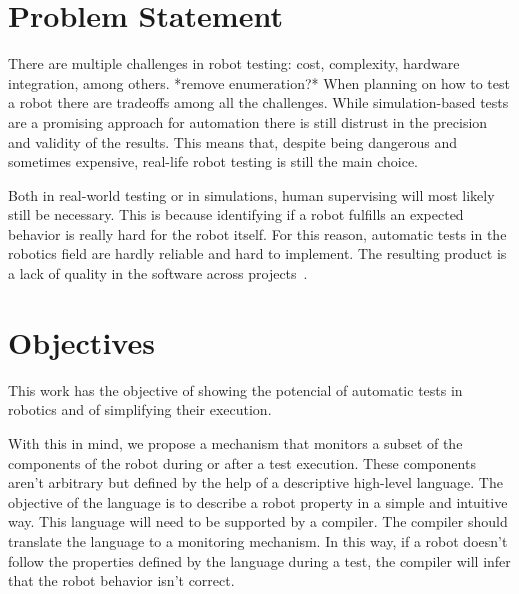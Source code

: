 \section{Problem Statement}
\label{sec:problem}

There are multiple challenges in robot testing: cost, 
complexity, hardware integration, among others. *remove enumeration?*
When planning on how to test a robot there are tradeoffs among all the challenges.
While simulation-based tests are a promising approach for automation 
there is still distrust in the precision and validity of the results.
This means that, despite being dangerous and sometimes expensive, real-life 
robot testing is still the main choice.

Both in real-world testing or in simulations, 
human supervising will most likely still be necessary.
This is because identifying if a robot fulfills an expected 
behavior is really hard for the robot itself.
For this reason, automatic tests in the robotics field are 
hardly reliable and hard to implement.
The resulting product is a lack of quality in the software 
across projects~\cite{TestRob}.


\section{Objectives}
\label{sec:objectives}

This work has the objective of showing the potencial of automatic 
tests in robotics and of simplifying their execution.




With this in mind, we propose a mechanism that monitors a subset of the components of the robot during or after a test execution.
These components aren't arbitrary but defined by the help of a descriptive high-level language.
The objective of the language is to describe a robot property in a simple and intuitive way.
This language will need to be supported by a compiler. 
The compiler should translate the language to a monitoring mechanism.
In this way, if a robot doesn't follow the properties defined by the language 
during a test, the compiler will infer that the robot behavior isn't correct. 

